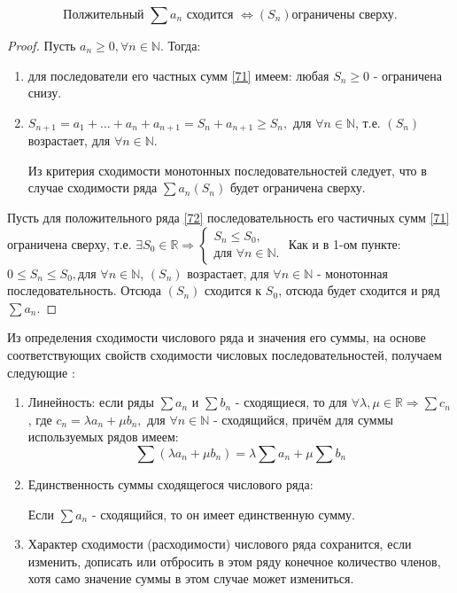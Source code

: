 \begin{theorem}
	\begin{equation*}
	\text{Полжительный }	\sum a_n \text{ сходится } \Leftrightarrow \left( S_n \right) \text{ограничены сверху.}
	\end{equation*}
\end{theorem}
\begin{proof}
	\circled{$\Rightarrow$} Пусть $a_n \geqslant 0, \forall n \in \mathbb{N}$. Тогда:
	\begin{enumerate}
		\item для последователи его частных сумм \eqref{71} имеем: любая $S_n \geqslant 0$ - ограничена снизу.
		\item $S_{n+1} = a_1 + \ldots + a_n + a_{n+1} = S_n + a_{n+1} \geqslant S_n,$ для $\forall n \in \mathbb{N}$, т.е. $\left( S_n \right)$ возрастает, для $\forall n \in \mathbb{N}$.
		
		Из критерия сходимости монотонных последовательностей следует, что в случае сходимости ряда $\sum a_n \left( S_n \right)$ будет ограничена сверху.
	\end{enumerate}
	
	\circled{$\Leftarrow$}
	Пусть для положительного ряда \eqref{72} последовательность его частичных сумм \eqref{71} ограничена сверху, т.е. $\exists S_0 \in \mathbb{R} \Rightarrow \begin{cases}
	S_n \leqslant S_0, \\
	\text{для }\forall n \in \mathbb{N}.
	\end{cases}$
	Как и в 1-ом пункте: $0 \leqslant S_n \leqslant S_0, \text{для }\forall n \in \mathbb{N}$, $\left( S_n \right)$ возрастает, для $\forall n \in \mathbb{N}$ - монотонная последовательность. Отсюда $\left( S_n \right)$ сходится к $S_0$, отсюда будет сходится и ряд $\sum a_n$.
\end{proof}

Из определения сходимости числового ряда и значения его суммы, на основе соответствующих свойств сходимости числовых последовательностей, получаем следующие :
\begin{enumerate}
	\item Линейность: если ряды $\sum a_n$ и $\sum b_n$ - сходящиеся, то для $\forall \lambda, \mu \in \mathbb{R} \Rightarrow \sum c_n$, где $c_n = \lambda a_n + \mu b_n, $    для $\forall n \in \mathbb{N}$ - сходящийся, причём для суммы используемых рядов имеем:
	\begin{equation*}
	\sum\limits (\lambda a_n + \mu b_n) = \lambda \sum\limits a_n + \mu \sum\limits b_n
	\end{equation*} 
	\item Единственность суммы сходящегося числового ряда:
	
	Если $\sum a_n $ - сходящийся, то он имеет единственную сумму.
	\item Характер сходимости (расходимости) числового ряда сохранится, если изменить, дописать или отбросить в этом ряду конечное количество членов, хотя само значение суммы в этом случае может измениться.
\end{enumerate}

